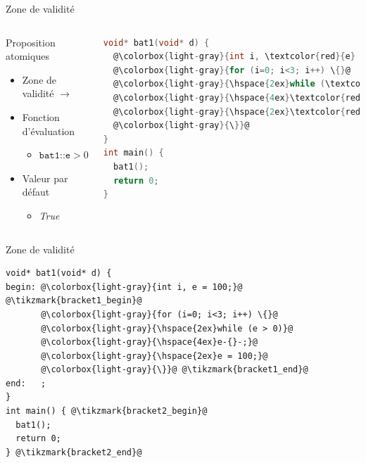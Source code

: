 \documentclass{beamer}
\newcommand{\tikzmark}[2][]{%
  \tikz[remember picture,overlay,baseline=-.5ex] \node[#1] (#2) {};%
}
\newcommand*{\drawBrace}[4][0pt]{%
    \node[draw=none, fit={(#2) (#3)}, inner sep=0pt] (rectg) {};%
    \draw [decoration={brace,amplitude=0.3em},decorate,very thick,red]%
      ([xshift=#1]rectg.north east) --%
      coordinate[right=1em, midway] (#2#3)
      ([xshift=#1]rectg.south east);%
    \node[right=1.5em of #2#3] (#2#3-comment) {#4};
    \draw (#2#3-comment.west) edge (#2#3);
}%
\begin{document}
\begin{frame}[fragile]{Zone de validité}
\begin{columns}[onlytextwidth, c]

  \begin{block}{Proposition atomiques}
  \begin{itemize}
  \item Zone de validité $\rightarrow$
    \item Fonction d'évaluation
      \begin{itemize}
        \item $\texttt{bat1::e} > 0$
      \end{itemize}
    \item Valeur par défaut
      \begin{itemize}
        \item \emph{True}
      \end{itemize}
  \end{itemize}
  \end{block}


\begin{lstlisting}[language=C]
void* bat1(void* d) {
  @\colorbox{light-gray}{int i, \textcolor{red}{e} = 100;}@
  @\colorbox{light-gray}{for (i=0; i<3; i++) \{}@
  @\colorbox{light-gray}{\hspace{2ex}while (\textcolor{red}{e} > 0)}@
  @\colorbox{light-gray}{\hspace{4ex}\textcolor{red}{e}-{}-;}@
  @\colorbox{light-gray}{\hspace{2ex}\textcolor{red}{e} = 100;}@
  @\colorbox{light-gray}{\}}@
}
int main() {
  bat1();
  return 0;
}
\end{lstlisting}
\end{columns}
\end{frame}

\begin{frame}[fragile]{Zone de validité}
\begin{lstlisting}
void* bat1(void* d) {
begin: @\colorbox{light-gray}{int i, e = 100;}@ @\tikzmark{bracket1_begin}@
       @\colorbox{light-gray}{for (i=0; i<3; i++) \{}@
       @\colorbox{light-gray}{\hspace{2ex}while (e > 0)}@
       @\colorbox{light-gray}{\hspace{4ex}e-{}-;}@
       @\colorbox{light-gray}{\hspace{2ex}e = 100;}@
       @\colorbox{light-gray}{\}}@ @\tikzmark{bracket1_end}@
end:   ;
}
int main() { @\tikzmark{bracket2_begin}@
  bat1();
  return 0;
} @\tikzmark{bracket2_end}@
\end{lstlisting}


\end{frame}
\end{document}
